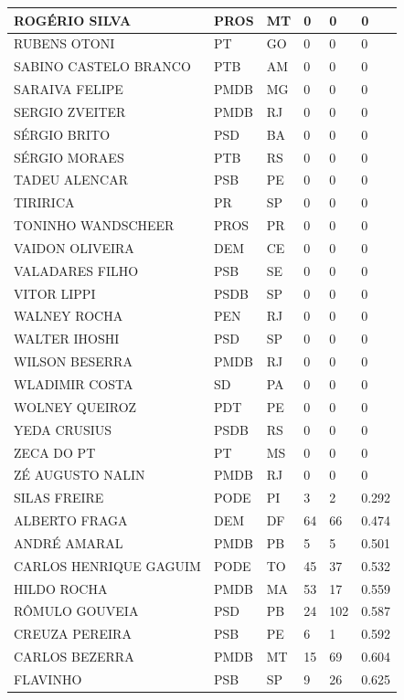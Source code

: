 \begin{apendicesenv}
\begin{longtable}{|L{4cm}|C{2cm}|C{1cm}|C{2cm}|C{1cm}|C{2cm}|}
ROGÉRIO SILVA & PROS & MT & 0 & 0 & 0 \\ \hline
RUBENS OTONI & PT & GO & 0 & 0 & 0 \\ \hline
SABINO CASTELO BRANCO & PTB & AM & 0 & 0 & 0 \\ \hline
SARAIVA FELIPE & PMDB & MG & 0 & 0 & 0 \\ \hline
SERGIO ZVEITER & PMDB & RJ & 0 & 0 & 0 \\ \hline
SÉRGIO BRITO & PSD & BA & 0 & 0 & 0 \\ \hline
SÉRGIO MORAES & PTB & RS & 0 & 0 & 0 \\ \hline
TADEU ALENCAR & PSB & PE & 0 & 0 & 0 \\ \hline
TIRIRICA & PR & SP & 0 & 0 & 0 \\ \hline
TONINHO WANDSCHEER & PROS & PR & 0 & 0 & 0 \\ \hline
VAIDON OLIVEIRA & DEM & CE & 0 & 0 & 0 \\ \hline
VALADARES FILHO & PSB & SE & 0 & 0 & 0 \\ \hline
VITOR LIPPI & PSDB & SP & 0 & 0 & 0 \\ \hline
WALNEY ROCHA & PEN & RJ & 0 & 0 & 0 \\ \hline
WALTER IHOSHI & PSD & SP & 0 & 0 & 0 \\ \hline
WILSON BESERRA & PMDB & RJ & 0 & 0 & 0 \\ \hline
WLADIMIR COSTA & SD & PA & 0 & 0 & 0 \\ \hline
WOLNEY QUEIROZ & PDT & PE & 0 & 0 & 0 \\ \hline
YEDA CRUSIUS & PSDB & RS & 0 & 0 & 0 \\ \hline
ZECA DO PT & PT & MS & 0 & 0 & 0 \\ \hline
ZÉ AUGUSTO NALIN & PMDB & RJ & 0 & 0 & 0 \\ \hline
SILAS FREIRE & PODE & PI & 3 & 2 & 0.292 \\ \hline
ALBERTO FRAGA & DEM & DF & 64 & 66 & 0.474 \\ \hline
ANDRÉ AMARAL & PMDB & PB & 5 & 5 & 0.501 \\ \hline
CARLOS HENRIQUE GAGUIM & PODE & TO & 45 & 37 & 0.532 \\ \hline
HILDO ROCHA & PMDB & MA & 53 & 17 & 0.559 \\ \hline
RÔMULO GOUVEIA & PSD & PB & 24 & 102 & 0.587 \\ \hline
CREUZA PEREIRA & PSB & PE & 6 & 1 & 0.592 \\ \hline
CARLOS BEZERRA & PMDB & MT & 15 & 69 & 0.604 \\ \hline
FLAVINHO & PSB & SP & 9 & 26 & 0.625 \\ \hline

\end{longtable}
\end{apendicesenv}
